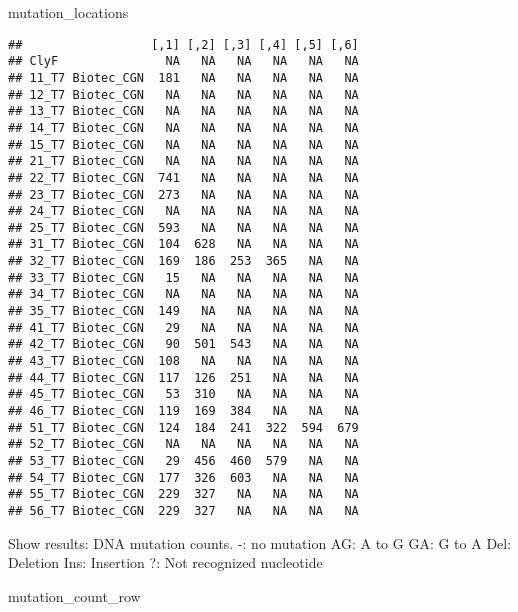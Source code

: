\documentclass[
]{article}
\newenvironment{Shaded}{\begin{snugshade}}{\end{snugshade}}
\newcommand{\NormalTok}[1]{#1}
\begin{document}
\begin{Shaded}
\begin{Highlighting}[]
\NormalTok{mutation\_locations}
\end{Highlighting}
\end{Shaded}

\begin{verbatim}
##                  [,1] [,2] [,3] [,4] [,5] [,6]
## ClyF               NA   NA   NA   NA   NA   NA
## 11_T7 Biotec_CGN  181   NA   NA   NA   NA   NA
## 12_T7 Biotec_CGN   NA   NA   NA   NA   NA   NA
## 13_T7 Biotec_CGN   NA   NA   NA   NA   NA   NA
## 14_T7 Biotec_CGN   NA   NA   NA   NA   NA   NA
## 15_T7 Biotec_CGN   NA   NA   NA   NA   NA   NA
## 21_T7 Biotec_CGN   NA   NA   NA   NA   NA   NA
## 22_T7 Biotec_CGN  741   NA   NA   NA   NA   NA
## 23_T7 Biotec_CGN  273   NA   NA   NA   NA   NA
## 24_T7 Biotec_CGN   NA   NA   NA   NA   NA   NA
## 25_T7 Biotec_CGN  593   NA   NA   NA   NA   NA
## 31_T7 Biotec_CGN  104  628   NA   NA   NA   NA
## 32_T7 Biotec_CGN  169  186  253  365   NA   NA
## 33_T7 Biotec_CGN   15   NA   NA   NA   NA   NA
## 34_T7 Biotec_CGN   NA   NA   NA   NA   NA   NA
## 35_T7 Biotec_CGN  149   NA   NA   NA   NA   NA
## 41_T7 Biotec_CGN   29   NA   NA   NA   NA   NA
## 42_T7 Biotec_CGN   90  501  543   NA   NA   NA
## 43_T7 Biotec_CGN  108   NA   NA   NA   NA   NA
## 44_T7 Biotec_CGN  117  126  251   NA   NA   NA
## 45_T7 Biotec_CGN   53  310   NA   NA   NA   NA
## 46_T7 Biotec_CGN  119  169  384   NA   NA   NA
## 51_T7 Biotec_CGN  124  184  241  322  594  679
## 52_T7 Biotec_CGN   NA   NA   NA   NA   NA   NA
## 53_T7 Biotec_CGN   29  456  460  579   NA   NA
## 54_T7 Biotec_CGN  177  326  603   NA   NA   NA
## 55_T7 Biotec_CGN  229  327   NA   NA   NA   NA
## 56_T7 Biotec_CGN  229  327   NA   NA   NA   NA
\end{verbatim}

Show results: DNA mutation counts. -: no mutation AG: A to G GA: G to A
Del: Deletion Ins: Insertion ?: Not recognized nucleotide

\begin{Shaded}
\begin{Highlighting}[]
\NormalTok{mutation\_count\_row}
\end{Highlighting}
\end{Shaded}
\end{document}
